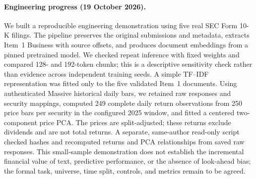 \paragraph{Engineering progress (19 October 2026).}
We built a reproducible engineering demonstration using five real SEC Form 10-K filings. The pipeline preserves the original submissions and metadata, extracts Item~1 Business with source offsets, and produces document embeddings from a pinned pretrained model. We checked repeat inference with fixed weights and compared 128- and 192-token chunks; this is a descriptive sensitivity check rather than evidence across independent training seeds. A simple TF--IDF representation was fitted only to the five validated Item~1 documents. Using authenticated Massive historical daily bars, we retained raw responses and security mappings, computed 249 complete daily return observations from 250 price bars per security in the configured 2025 window, and fitted a centered two-component price PCA. The prices are split-adjusted; these returns exclude dividends and are not total returns. A separate, same-author read-only script checked hashes and recomputed returns and PCA relationships from saved raw responses. This small-sample demonstration does not establish the incremental financial value of text, predictive performance, or the absence of look-ahead bias; the formal task, universe, time split, controls, and metrics remain to be agreed.
